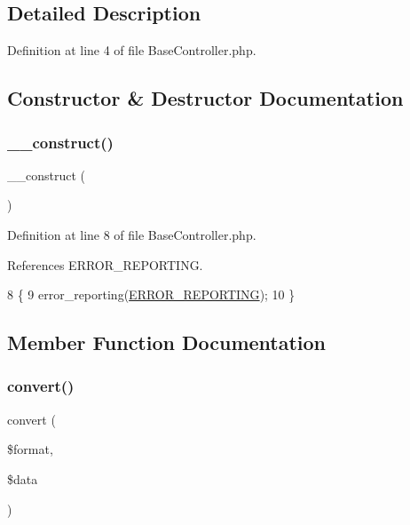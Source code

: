 \subsection{Detailed Description}


Definition at line 4 of file Base\+Controller.\+php.



\subsection{Constructor \& Destructor Documentation}
\hypertarget{class_base_controller_a095c5d389db211932136b53f25f39685}{}\label{class_base_controller_a095c5d389db211932136b53f25f39685} 
\subsubsection{\texorpdfstring{\+\_\+\+\_\+construct()}{\_\_construct()}}
{\footnotesize\ttfamily \+\_\+\+\_\+construct (\begin{DoxyParamCaption}{ }\end{DoxyParamCaption})}



Definition at line 8 of file Base\+Controller.\+php.



References E\+R\+R\+O\+R\+\_\+\+R\+E\+P\+O\+R\+T\+I\+NG.


\begin{DoxyCode}
8                                   \{
9         error\_reporting(\hyperlink{config_8php_a80c2f40a4ce1ad3cbfb1978239f63c31}{ERROR\_REPORTING});
10     \}
\end{DoxyCode}


\subsection{Member Function Documentation}
\hypertarget{class_base_controller_a0fd54f433ce0bd8881479f3eb30e13ec}{}\label{class_base_controller_a0fd54f433ce0bd8881479f3eb30e13ec} 
\subsubsection{\texorpdfstring{convert()}{convert()}}
{\footnotesize\ttfamily convert (\begin{DoxyParamCaption}\item[{}]{\$format,  }\item[{}]{\$data }\end{DoxyParamCaption})}

